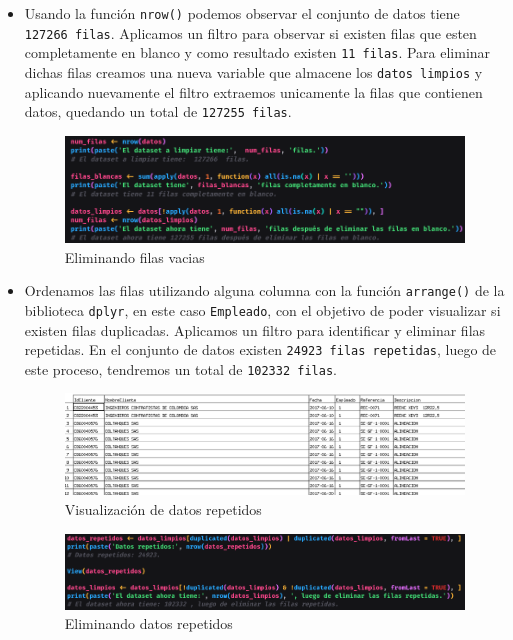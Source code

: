 \documentclass[12pt]{article}
\begin{document}
            \begin{itemize}
                \item Usando la función \texttt{nrow()} podemos observar el conjunto de datos tiene \texttt{127266 filas}. Aplicamos un filtro para observar si existen filas que esten completamente en blanco y como resultado existen \texttt{11 filas}. Para eliminar dichas filas creamos una nueva variable que almacene los \texttt{datos limpios} y aplicando nuevamente el filtro extraemos unicamente la filas que contienen datos, quedando un total de \texttt{127255 filas}.
                    \begin{figure}[h]
                        \centering 
                        \includegraphics[width=1\textwidth]{img/limpieza-4.png}
                        \caption{Eliminando filas vacias}
                    \end{figure}

                \item Ordenamos las filas utilizando alguna columna con la función \texttt{arrange()} de la biblioteca \texttt{dplyr}, en este caso \texttt{Empleado}, con el objetivo de poder visualizar si existen filas duplicadas. Aplicamos un filtro para identificar y eliminar filas repetidas. En el conjunto de datos existen \texttt{24923 filas repetidas}, luego de este proceso, tendremos un total de \texttt{102332 filas}.
                    \begin{figure}[h]
                        \centering 
                        \includegraphics[width=1\textwidth]{img/limpieza-5.png}
                        \caption{Visualización de datos repetidos}
                    \end{figure}

                    \newpage
                    \begin{figure}[h]
                        \centering 
                        \includegraphics[width=1\textwidth]{img/limpieza-6.png}
                        \caption{Eliminando datos repetidos}
                    \end{figure}
                

\end{itemize}
\end{document}
